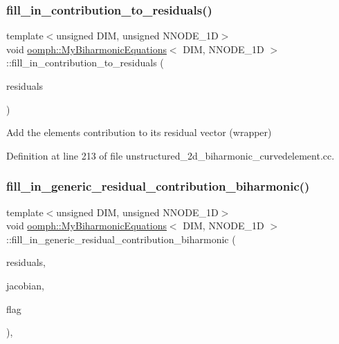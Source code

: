 \subsubsection{\texorpdfstring{fill\+\_\+in\+\_\+contribution\+\_\+to\+\_\+residuals()}{fill\_in\_contribution\_to\_residuals()}\hspace{0.1cm}{\footnotesize\ttfamily [2/2]}}
{\footnotesize\ttfamily template$<$unsigned D\+IM, unsigned N\+N\+O\+D\+E\+\_\+1D$>$ \\
void \hyperlink{classoomph_1_1MyBiharmonicEquations}{oomph\+::\+My\+Biharmonic\+Equations}$<$ D\+IM, N\+N\+O\+D\+E\+\_\+1D $>$\+::fill\+\_\+in\+\_\+contribution\+\_\+to\+\_\+residuals (\begin{DoxyParamCaption}\item[{Vector$<$ double $>$ \&}]{residuals }\end{DoxyParamCaption})\hspace{0.3cm}{\ttfamily [inline]}}



Add the element\textquotesingle{}s contribution to its residual vector (wrapper) 



Definition at line 213 of file unstructured\+\_\+2d\+\_\+biharmonic\+\_\+curvedelement.\+cc.

\mbox{\label{classoomph_1_1MyBiharmonicEquations_a7c8e87734c960107ed1dc7f2e0b4f891}} 
\subsubsection{\texorpdfstring{fill\+\_\+in\+\_\+generic\+\_\+residual\+\_\+contribution\+\_\+biharmonic()}{fill\_in\_generic\_residual\_contribution\_biharmonic()}\hspace{0.1cm}{\footnotesize\ttfamily [1/2]}}
{\footnotesize\ttfamily template$<$unsigned D\+IM, unsigned N\+N\+O\+D\+E\+\_\+1D$>$ \\
void \hyperlink{classoomph_1_1MyBiharmonicEquations}{oomph\+::\+My\+Biharmonic\+Equations}$<$ D\+IM, N\+N\+O\+D\+E\+\_\+1D $>$\+::fill\+\_\+in\+\_\+generic\+\_\+residual\+\_\+contribution\+\_\+biharmonic (\begin{DoxyParamCaption}\item[{Vector$<$ double $>$ \&}]{residuals,  }\item[{Dense\+Matrix$<$ double $>$ \&}]{jacobian,  }\item[{const unsigned \&}]{flag }\end{DoxyParamCaption})\hspace{0.3cm}{\ttfamily [protected]}, {\ttfamily [virtual]}}



